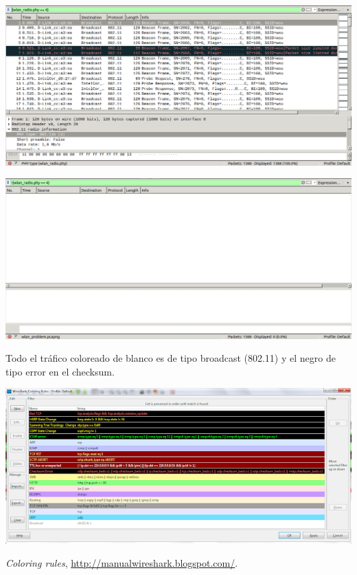 \documentclass{article}
\begin{document}
\begin{center}
\includegraphics[scale=0.3]{WLAN/802_11}
\end{center}
\begin{center}
\includegraphics[scale=0.3]{WLAN/not802_11}
\end{center}

Todo el tráfico coloreado de blanco es de tipo broadcast (802.11) y el negro de tipo error en el checksum.

\begin{center}
\includegraphics[scale=0.6]{WLAN/documentacion.png} 
\end{center}

\begin{thebibliography}{9}

 \textit{Coloring rules}, \url{http://manualwireshark.blogspot.com/}.

\end{thebibliography}
\end{document}
